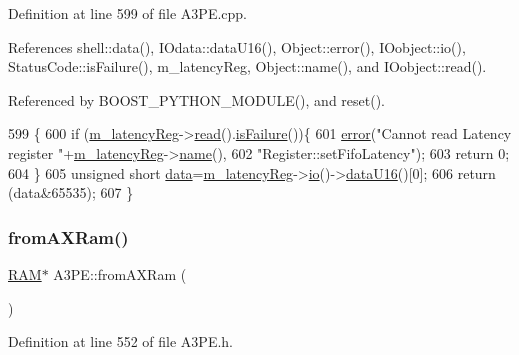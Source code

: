 Definition at line 599 of file A3\+P\+E.\+cpp.



References shell\+::data(), I\+Odata\+::data\+U16(), Object\+::error(), I\+Oobject\+::io(), Status\+Code\+::is\+Failure(), m\+\_\+latency\+Reg, Object\+::name(), and I\+Oobject\+::read().



Referenced by B\+O\+O\+S\+T\+\_\+\+P\+Y\+T\+H\+O\+N\+\_\+\+M\+O\+D\+U\+L\+E(), and reset().


\begin{DoxyCode}
599                               \{
600   \textcolor{keywordflow}{if} (\hyperlink{classA3PE_a96a167e73e264da5a18d9ddb5ebb5f23}{m\_latencyReg}->\hyperlink{classIOobject_aa07610c11963b1db6710e3c76ceea456}{read}().\hyperlink{classStatusCode_a5dd22dc6eb2c52fc4cabc58f6dea2eb7}{isFailure}())\{
601     \hyperlink{classObject_a204a95f57818c0f811933917a30eff45}{error}(\textcolor{stringliteral}{"Cannot read Latency register "}+\hyperlink{classA3PE_a96a167e73e264da5a18d9ddb5ebb5f23}{m\_latencyReg}->\hyperlink{classObject_a300f4c05dd468c7bb8b3c968868443c1}{name}(),
602         \textcolor{stringliteral}{"Register::setFifoLatency"});
603     \textcolor{keywordflow}{return} 0;
604   \}
605   \textcolor{keywordtype}{unsigned} \textcolor{keywordtype}{short} \hyperlink{namespaceshell_a5ea2525995cedc3efd69ea8a7f034d1e}{data}=\hyperlink{classA3PE_a96a167e73e264da5a18d9ddb5ebb5f23}{m\_latencyReg}->\hyperlink{classIOobject_af04fb94137c3d86849f478ac5afab5d1}{io}()->\hyperlink{classIOdata_a8d8528b731c6cf117f8c5b9b2473390c}{dataU16}()[0];
606   \textcolor{keywordflow}{return} (data&65535);   
607 \}
\end{DoxyCode}
\mbox{\label{classA3PE_a7c9026a74c1954b2d250be05fbc1c8c5}} 
\subsubsection{\texorpdfstring{from\+A\+X\+Ram()}{fromAXRam()}}
{\footnotesize\ttfamily \hyperlink{classRAM}{R\+AM}$\ast$ A3\+P\+E\+::from\+A\+X\+Ram (\begin{DoxyParamCaption}{ }\end{DoxyParamCaption})\hspace{0.3cm}{\ttfamily [inline]}}



Definition at line 552 of file A3\+P\+E.\+h.



